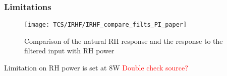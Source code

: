 \subsubsection{Limitations}
\begin{figure}[H]
\texttt{[image: TCS/IRHF/IRHF\_compare\_filts\_PI\_paper]}
\caption{Comparison of the natural RH response and the response to the filtered input with RH power}
\label{fig:RH_power}
\end{figure}
Limitation on RH power is set at 8W \textcolor{red}{Double check source?}


